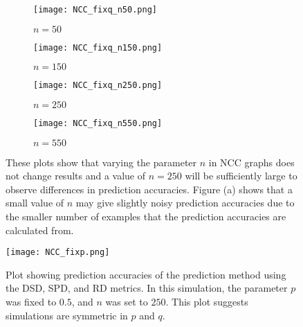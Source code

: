 \begin{figure}[H]
\begin{subfigure}[h]{0.5\linewidth}
\texttt{[image: NCC\_fixq\_n50.png]}
\caption{$n = 50$}
\end{subfigure}
\hfill
\begin{subfigure}[h]{0.5\linewidth}
\texttt{[image: NCC\_fixq\_n150.png]}
\caption{$n = 150$}
\end{subfigure}
\hfill
\begin{subfigure}[h]{0.5\linewidth}
\texttt{[image: NCC\_fixq\_n250.png]}
\caption{$n = 250$}
\end{subfigure}
\hfill
\begin{subfigure}[h]{0.5\linewidth}
\texttt{[image: NCC\_fixq\_n550.png]}
\caption{$n = 550$}
\end{subfigure}%
\caption{These plots show that varying the parameter $n$ in NCC graphs does not change results and a value of $n=250$ will be sufficiently large to observe differences in prediction accuracies. Figure (a) shows that a small value of $n$ may give slightly noisy prediction accuracies due to the smaller number of examples that the prediction accuracies are calculated from.}
\label{fig:NCC_n}
\end{figure}

\begin{figure}[H]
\centering
\texttt{[image: NCC\_fixp.png]}
\caption{Plot showing prediction accuracies of the prediction method using the DSD, SPD, and RD metrics. In this simulation, the parameter $p$ was fixed to $0.5$, and $n$ was set to $250$. This plot suggests simulations are symmetric in $p$ and $q$.}
\label{fig:NCC_fixp}
\end{figure}


